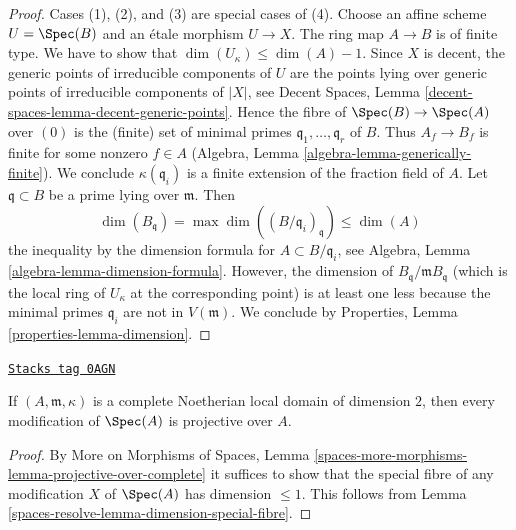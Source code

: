 \begin{proof}
Cases (1), (2), and (3) are special cases of (4). Choose an affine scheme
$U = \Spec(B)$ and an \'etale morphism $U \to X$. The ring map $A \to B$
is of finite type. We have to show that
$\dim(U_\kappa) \leq \dim(A) - 1$. Since $X$ is decent, the generic
points of irreducible components of $U$ are the points lying over
generic points of irreducible components of $|X|$, see
Decent Spaces, Lemma \ref{decent-spaces-lemma-decent-generic-points}.
Hence the fibre of $\Spec(B) \to \Spec(A)$ over $(0)$
is the (finite) set of minimal primes $\mathfrak q_1, \ldots, \mathfrak q_r$
of $B$. Thus $A_f \to B_f$ is finite for some nonzero $f \in A$
(Algebra, Lemma \ref{algebra-lemma-generically-finite}).
We conclude $\kappa(\mathfrak q_i)$ is a finite extension of the
fraction field of $A$.
Let $\mathfrak q \subset B$ be a prime lying over $\mathfrak m$. Then
$$
\dim(B_\mathfrak q) = \max \dim((B/\mathfrak q_i)_{\mathfrak q})
\leq \dim(A)
$$
the inequality by the dimension formula for $A \subset B/\mathfrak q_i$, see
Algebra, Lemma \ref{algebra-lemma-dimension-formula}.
However, the dimension of $B_\mathfrak q/\mathfrak m B_\mathfrak q$
(which is the local ring of $U_\kappa$ at the corresponding point)
is at least one less because the minimal primes $\mathfrak q_i$
are not in $V(\mathfrak m)$. We conclude by
Properties, Lemma \ref{properties-lemma-dimension}.
\end{proof}

\begin{lemma}
\label{spaces-resolve-lemma-modification-of-dim-2-is-projective-over-complete}
\href{https://stacks.math.columbia.edu/tag/0AGN}{\texttt{Stacks tag 0AGN}}

If $(A, \mathfrak m, \kappa)$ is a complete Noetherian local domain
of dimension $2$, then every modification of $\Spec(A)$ is projective over $A$.
\end{lemma}

\begin{proof}
By More on Morphisms of Spaces, Lemma
\ref{spaces-more-morphisms-lemma-projective-over-complete}
it suffices to show that the special fibre of any modification
$X$ of $\Spec(A)$ has dimension $\leq 1$.
This follows from Lemma \ref{spaces-resolve-lemma-dimension-special-fibre}.
\end{proof}

